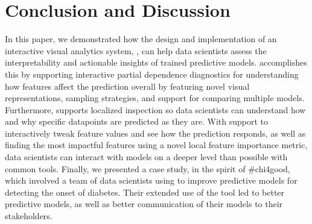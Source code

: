 
\section{Conclusion and Discussion}

In this paper, we demonstrated how the design and implementation of an interactive visual analytics system,
\prospector, can help data scientists assess the interpretability and actionable insights of trained predictive models. \prospector accomplishes this by supporting interactive partial dependence diagnostics for understanding how features affect the prediction overall by featuring novel visual representations, sampling strategies, and support for comparing multiple models.  Furthermore, \prospector supports localized inspection so data scientists can understand how and why specific datapoints are predicted as they are.  With support to interactively tweak feature values and see how the prediction responds, as well as finding the most impactful features using a novel local feature importance metric, data scientists can interact with models on a deeper level than possible with common tools.  Finally, we presented a case study, in the spirit of \#chi4good, which involved a team of data scientists using \prospector  to improve predictive models for detecting the onset of diabetes.  Their extended use of the tool led to better predictive models, as well as better communication of their models to their stakeholders.



